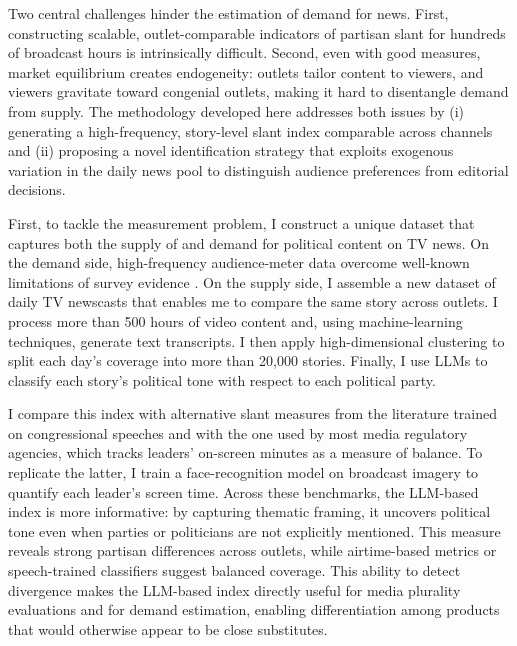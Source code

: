 \documentclass[12pt]{article}
\begin{document}

Two central challenges hinder the estimation of demand for news. First, constructing scalable, outlet-comparable indicators of partisan slant for hundreds of broadcast hours is intrinsically difficult. Second, even with good measures, market equilibrium creates endogeneity: outlets tailor content to viewers, and viewers gravitate toward congenial outlets, making it hard to disentangle demand from supply. The methodology developed here addresses both issues by (i) generating a high-frequency, story-level slant index comparable across channels and (ii) proposing a novel identification strategy that exploits exogenous variation in the daily news pool to distinguish audience preferences from editorial decisions.

First, to tackle the measurement problem, I construct a unique dataset that captures both the supply of and demand for political content on TV news. On the demand side, high-frequency audience-meter data overcome well-known limitations of survey evidence \citep{prior}. On the supply side, I assemble a new dataset of daily TV newscasts that enables me to compare the same story across outlets. I process more than 500 hours of video content and, using machine-learning techniques,  generate text transcripts. I then apply high-dimensional clustering to split each day’s coverage into more than 20,000 stories. Finally, I use LLMs to classify each story’s political tone with respect to each political party.



I compare this index with alternative slant measures from the literature trained on congressional speeches and with the one used by most media regulatory agencies, which tracks leaders’ on-screen minutes as a measure of balance. To replicate the latter, I train a face-recognition model on broadcast imagery to quantify each leader’s screen time. Across these benchmarks, the LLM-based index is more informative: by capturing thematic framing, it uncovers political tone even when parties or politicians are not explicitly mentioned. This measure reveals strong partisan differences across outlets, while airtime-based metrics or speech-trained classifiers suggest balanced coverage. This ability to detect divergence makes the LLM-based index directly useful for media plurality evaluations and for demand estimation, enabling differentiation among products that would otherwise appear to be close substitutes.
\end{document}
